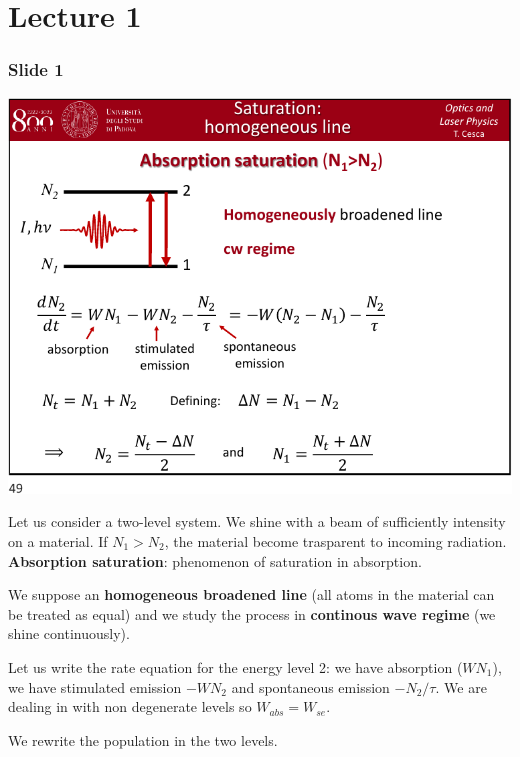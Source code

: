 \documentclass[../main/main.tex]{subfiles}
\begin{document}
\pagestyle{plain}

\section{Lecture 1}


\subsubsection*{Slide 1}

\begin{minipage}[]{0.5\linewidth}
\centering
\includegraphics[page=1,width=1\textwidth]{../lessons/pdf_file/10_lecture.pdf}
\end{minipage}
\hspace{0.3cm}\vspace{0.3cm}
\begin{minipage}[c]{0.47\linewidth}

Let us consider a two-level system. We shine with a beam of sufficiently intensity on a material.
If \( N_1 > N_2 \), the material become trasparent to incoming radiation.
\textbf{Absorption saturation}: phenomenon of saturation in absorption.

We suppose an \textbf{homogeneous broadened line} (all atoms in the material can be treated as equal) and we study the process in \textbf{continous wave regime} (we shine continuously).

Let us write the rate equation for the energy level 2: we have absorption (\( W N_1 \)), we have stimulated emission \( -W N_2 \) and spontaneous emission \( - N_2/\tau  \). We are dealing in with non degenerate levels so \( W_{abs} = W_{se} \).

We rewrite the population in the two levels.

\end{minipage}
\end{document}
